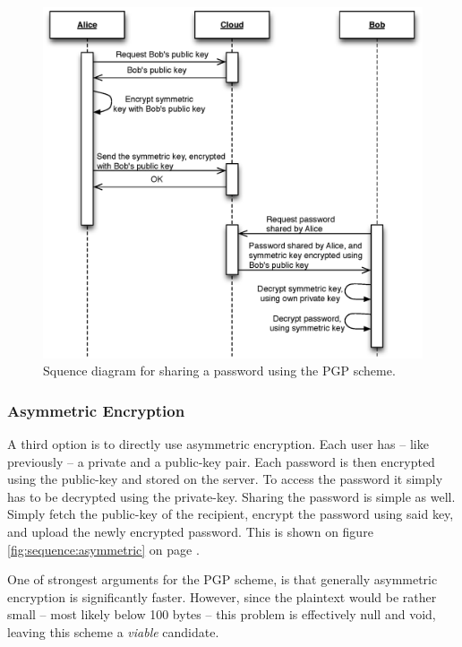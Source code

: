 				\begin{figure}[h!]
					\centering
					\includegraphics[width=\textwidth]{figures/design/uml/sequence/sharing-pgp.eps}
					\caption{Squence diagram for sharing a password using the PGP scheme.}
					\label{fig:sequence:pgp}
				\end{figure}

			\subsubsection{Asymmetric Encryption}
				\label{sec:assymetric}
				A third option is to directly use asymmetric encryption. Each user has -- like previously -- a private and a public-key pair. Each password is then encrypted using the public-key and stored on the server. To access the password it simply has to be decrypted using the private-key. Sharing the password is simple as well. Simply fetch the public-key of the recipient, encrypt the password using said key, and upload the newly encrypted password. This is shown on figure \ref{fig:sequence:asymmetric} on page \pageref{fig:sequence:asymmetric}.

				One of strongest arguments for the PGP scheme, is that generally asymmetric encryption is significantly faster. However, since the plaintext would be rather small -- most likely below 100 bytes -- this problem is effectively null and void, leaving this scheme a \emph{viable} candidate.

